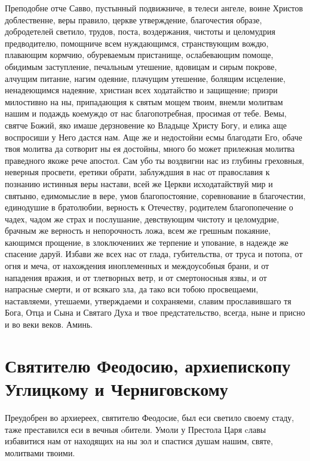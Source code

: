 Преподобне отче Савво, пустынный подвижниче, в телеси ангеле, воине Христов доблественне, веры правило, церкве утверждение, благочестия образе, добродетелей светило, трудов, поста, воздержания, чистоты и целомудрия предводителю, помощниче всем нуждающимся, странствующим вождю, плавающим кормчию, обуреваемым пристанище, ослабевающим помоще, обидимым заступление, печальным утешение, вдовицам и сирым покрове, алчущим питание, нагим одеяние, плачущим утешение, болящим исцеление, ненадеющимся надеяние, христиан всех ходатайство и защищение; призри милостивно на ны, припадающия к святым мощем твоим, внемли молитвам нашим и подаждь коемуждо от нас благопотребная, просимая от тебе. Вемы, святче Божий, яко имаше дерзновение ко Владыце Христу Богу, и елика аще воспросиши у Него дастся нам. Аще же и недостойни есмы благодати Его, обаче твоя молитва да сотворит ны ея достойны, много бо может прилежная молитва праведного якоже рече апостол. Сам убо ты воздвигни нас из глубины греховныя, неверныя просвети, еретики обрати, заблуждшия в нас от православия к познанию истинныя веры настави, всей же Церкви исходатайствуй мир и святыню, едимомыслие в вере, умов благопостояние, соревнование в благочестии, единодушие в братолюбии, верность к Отечеству, родителем благопопечение о чадех, чадом же страх и послушание, девствующим чистоту и целомудрие, брачным же верность н непорочность ложа, всем же грешным покаяние, кающимся прощение, в злоключениих же терпение и упование, в надежде же спасение даруй. Избави же всех нас от глада, губительства, от труса и потопа, от огня и меча, от нахождения иноплеменных и междоусобныя брани, и от нападения вражия, и от тлетворных ветр, и от смертоносныя язвы, и от напрасные смерти, и от всякаго зла, да тако вси тобою просвещаеми, наставляеми, утешаеми, утверждаеми и сохраняеми, славим прославившаго тя Бога, Отца и Сына и Святаго Духа и твое предстательство, всегда, ныне и присно и во веки веков. Аминь.


\section{Святителю Феодосию, архиепископу Углицкому и  Черниговскому}
 




Преудобрен во архиереех, святителю Феодосие, был еси светило своему стаду, таже преставился еси в вечныя oбители. Умоли у Престола Царя cлавы избавитися нам от находящих на ны зол и спастися душам нашим, святе, молитвами твоими.


